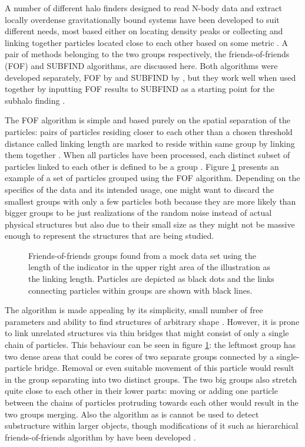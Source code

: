 \documentclass[english, oneside]{HYgradu}
\begin{document}
A number of different halo finders designed to read N-body data and extract locally overdense gravitationally bound systems have been developed to suit different needs, most based either on locating density peaks or collecting and linking together particles located close to each other based on some metric \citep{knebe2013structure}. A pair of methods belonging to the two groups respectively, the friends-of-friends (FOF) and SUBFIND algorithms, are discussed here. Both algorithms were developed separately, FOF by \citet{davis1985evolution} and SUBFIND by \citet{springel2001populating}, but they work well when used together by inputting FOF results to SUBFIND as a starting point for the subhalo finding \citep{springel2005cosmological}.

The FOF algorithm is simple and based purely on the spatial separation of the particles: pairs of particles residing closer to each other than a chosen threshold distance called linking length are marked to reside within same group by linking them together \citep{davis1985evolution}. When all particles have been processed, each distinct subset of particles linked to each other is defined to be a group \citep{davis1985evolution}. Figure \ref{fig:fof} presents an example of a set of particles grouped using the FOF algorithm. Depending on the specifics of the data and its intended usage, one might want to discard the smallest groups with only a few particles both because they are more likely than bigger groups to be just realizations of the random noise instead of actual physical structures but also due to their small size as they might not be massive enough to represent the structures that are being studied.

\begin{figure}
    \centering
    
    \caption{Friends-of-friends groups found from a mock data set using the length of the indicator in the upper right area of the illustration as the linking length. Particles are depicted as black dots and the links connecting particles within groups are shown with black lines.}\label{fig:fof}
\end{figure}

The algorithm is made appealing by its simplicity, small number of free parameters and ability to find structures of arbitrary shape \citep{davis1985evolution}. However, it is prone to link unrelated structures via thin bridges that might consist of only a single chain of particles. This behaviour can be seen in figure \ref{fig:fof}: the leftmost group has two dense areas that could be cores of two separate groups connected by a single-particle bridge. Removal or even suitable movement of this particle would result in the group separating into two distinct groups. The two big groups also stretch quite close to each other in their lower parts: moving or adding one particle between the chains of particles protruding towards each other would result in the two groups merging. Also the algorithm as is cannot be used to detect substructure within larger objects, though modifications of it such as hierarchical friends-of-friends algorithm by \citet{Gottlober1999halo} have been developed \cite{springel2001populating}.
\end{document}
